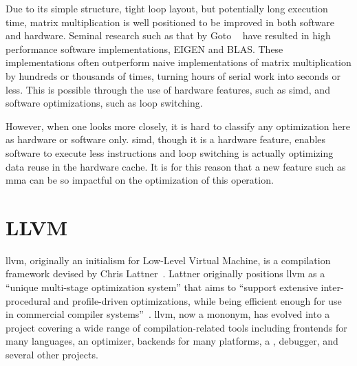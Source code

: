\documentclass[\main/thesis.tex]{subfiles}
\begin{document}
Due to its simple structure, tight loop layout, but potentially long execution time, matrix multiplication is well positioned to be improved in both software and hardware.
Seminal research such as that by Goto \etal~\autocite{goto2008anatomy} have resulted in high performance software implementations, \eg EIGEN and BLAS.
These implementations often outperform naive implementations of matrix multiplication by hundreds or thousands of times, turning hours of serial work into seconds or less.
This is possible through the use of hardware features, such as \gls{simd}, and software optimizations, such as loop switching.

However, when one looks more closely, it is hard to classify any optimization here as hardware or software only.
\Gls{simd}, though it is a hardware feature, enables software to execute less instructions and loop switching is actually optimizing data reuse in the hardware cache.
It is for this reason that a new feature such as \gls{mma} can be so impactful on the optimization of this operation.

\section{LLVM}
\label{sec:llvm}
\Gls{llvm}, originally an initialism for Low-Level Virtual Machine, is a compilation framework devised by Chris Lattner~\autocite{lattner2002llvm,lattner2004llvm}.
Lattner originally positions \gls{llvm} as a ``unique multi-stage optimization system'' that aims to ``support extensive inter-procedural and profile-driven optimizations, while being efficient enough for use in commercial compiler systems''~\autocite{lattner2002llvm}.
\Gls{llvm}, now a mononym, has evolved into a project covering a wide range of compilation-related tools including frontends for many languages, an optimizer, backends for many platforms, a , debugger, and several other projects.
\end{document}
